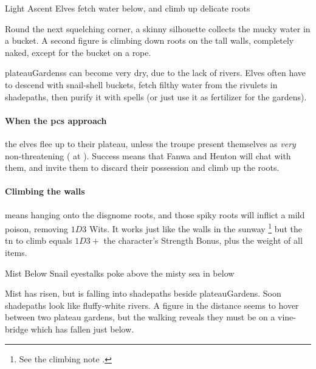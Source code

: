 
{Light Ascent}%
{Elves fetch water below, and climb up delicate roots}%
\label{shadeAscent}

\begin{boxtext}
  Round the next squelching corner, a skinny silhouette collects the mucky water in a bucket.
  A second figure is climbing down roots on the tall walls, completely naked, except for the bucket on a rope.
\end{boxtext}

\Glspl{plateauGardens} can become very dry, due to the lack of rivers.
Elves often have to descend with snail-shell buckets, fetch filthy water from the rivulets in \gls{shadepaths}, then purify it with spells (or just use it as fertilizer for the gardens).

\paragraph{When the \glspl{pc} approach}
the elves flee up to their plateau, unless the troupe present themselves as \emph{very} non-threatening ( at \tn[10]).
Success means that Fanwa and Henton will chat with them, and invite them to discard their possession and climb up the roots.


\showStdSpells

\paragraph{Climbing the walls}
means hanging onto the \gls{disgnome} roots, and those spiky roots will inflict a mild poison, removing $1D3$ Wits.
It works just like the walls in the \gls{sunway}%
\footnote{See the climbing note .}
but the \gls{tn} to climb equals $1D3 +$ the character's Strength Bonus, plus the \gls{weight} of all items.

{Mist Below}%
{Snail eyestalks poke above the misty sea in  below}%

\begin{boxtext}
  Mist has risen, but is falling into \gls{shadepaths} beside \gls{plateauGardens}.
  Soon \gls{shadepaths} look like fluffy-white rivers.
  A figure in the distance seems to hover between two plateau gardens, but the walking reveals they must be on a vine-bridge which has fallen just below.
\end{boxtext}

